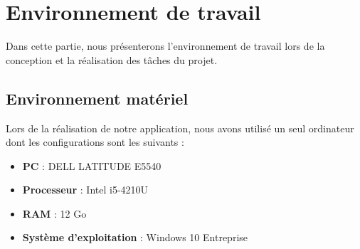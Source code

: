 \section[Environnement de travail]{Environnement de travail}
Dans cette partie, nous présenterons l’environnement de travail lors de la conception et la réalisation des tâches du projet.
\subsection[Environnement matériel]{Environnement matériel}
Lors de la réalisation de notre application, nous avons utilisé un seul ordinateur dont les configurations sont les suivants :
\begin{itemize}
	\item \textbf{PC} : DELL LATITUDE E5540
	\item \textbf{Processeur} : Intel i5-4210U
	\item \textbf{RAM} : 12 Go
	\item \textbf{Système d’exploitation} : Windows 10 Entreprise	
\end{itemize}
